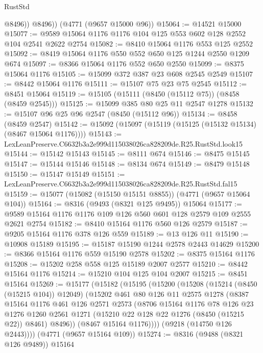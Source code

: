 \begin{lexlean}{RustStd}
\begin{coremodule}
            @8496))
        @8496))
    (@4771 (@9657 @15000 @96))
@15064 := @14521 @15000
@15077 := @9589 @15064 @1176 @1176 @104 @125 @553 @602 @128 @2552 @104 @2541 @2622 @2754
@15082 := @8410 @15064 @1176 @553 @125 @2552
@15092 := @8419 @15064 @1176 @550 @552 @650 @125 @1244 @2550 @1209 @674
@15097 := @8366 @15064 @1176 @552 @650 @2550
@15099 := @8375 @15064 @1176
@15105 := @15099 @372 @387 @23 @608 @2545 @2549
@15107 := @8442 @15064 @1176
@15111 := @15107 @75 @23 @75 @2545
@15112 := @8451 @15064
@15119 := @15105 (@15111 (@8450 (@15112 @75)) (@8458 (@8459 @2545)))
@15125 := @15099 @385 @80 @25 @11 @2547 @1278
@15132 := @15107 @96 @25 @96 @2547 (@8450 (@15112 @96))
@15134 := @8458 (@8459 @2547)
@15142 := @15092 (@15097 (@15119 (@15125 (@15132 @15134) (@8467 @15064 @1176))))
@15143 := LexLeanPreserve.C6632b3a2e999d115038026ca828209de.R25.RustStd.look15
@15144 := @15142 @15143
@15145 := @8111 @674
@15146 := @8475 @15145
@15147 := @15144 @15146
@15148 := @8134 @674
@15149 := @8479 @15148
@15150 := @15147 @15149
@15151 := LexLeanPreserve.C6632b3a2e999d115038026ca828209de.R25.RustStd.fal15
@15159 := @15077 (@15082 (@15150 @15151 @8855)) (@4771 (@9657 @15064 @104))
@15164 := @8316 (@9493 (@8321 @125 @9495)) @15064
@15177 := @9589 @15164 @1176 @1176 @109 @126 @560 @601 @128 @2579 @109 @2555 @2621 @2754
@15182 := @8410 @15164 @1176 @560 @126 @2579
@15187 := @9205 @15164 @1176 @378 @126 @559
@15189 := @13 @126 @11
@15190 := @10908 @15189
@15195 := @15187 @15190 @1244 @2578 @2443 @14629
@15200 := @8366 @15164 @1176 @559 @15190 @2578
@15202 := @8375 @15164 @1176
@15208 := @15202 @258 @558 @125 @15189 @2007 @2577
@15210 := @8442 @15164 @1176
@15214 := @15210 @104 @125 @104 @2007
@15215 := @8451 @15164
@15269 := @15177
    (@15182
      (@15195
        (@15200
          (@15208
            (@15214 (@8450 (@15215 @104)) @12049)
            (@15202
              @461
              @80
              @126
              @11
              @2575
              @1278
              (@8387
                @15164
                @1176
                @461
                @126
                @2571
                @2573
                (@8706
                  @15164
                  @1176
                  @78
                  @126
                  @23
                  @1276
                  @1260
                  @2561
                  @1271
                  (@15210 @22 @128 @22 @1276 (@8450 (@15215 @22)) @8461)
                  @8496))
              (@8467 @15164 @1176))))
        (@9218 (@14750 @126 @2443))))
    (@4771 (@9657 @15164 @109))
@15274 := @8316 (@9488 (@8321 @126 @9489)) @15164

\end{coremodule}
\end{lexlean}
